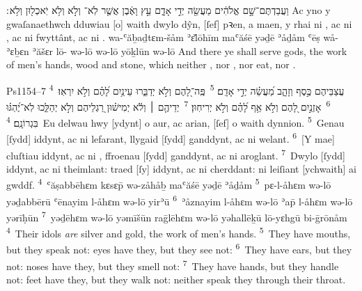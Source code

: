 \begin{example}{5}{4}{28}{}{}
	\quoling
	{וַעֲבַדְתֶּם־שָׁ֣ם אֱלֹהִ֔ים מַעֲשֵׂ֖ה יְדֵ֣י אָדָ֑ם עֵ֣ץ וָאֶ֔בֶן אֲשֶׁ֤ר לֹֽא־ וְלֹ֣א  וְלֹ֥א יֹֽאכְל֖וּן וְלֹ֥א ׃}
	{Ac yno y gwaſanaethwch dduwiau [o] waith dwylo dŷn, [ſef] pꝛen, a maen, y rhai ni , ac ni , ac ni fwyttânt, ac ni .}
	{wa-ʿăḇaḏtɛm-šåm ʾɛ̆lōhīm maʿăśē yəḏē ʾåḏåm ʿēṣ wå-ʾɛḇɛn ʾăšɛr lō- wə-lō  wə-lō yōḵlūn wə-lō }
	{And there ye shall serve gods, the work of men’s hands, wood and stone, which neither , nor , nor eat, nor .}
\end{example}

\begin{example}{Ps}{115}{4–7}{}{}
	\quoling	
	{\textsuperscript{4}~עֲצַבֵּיהֶם כֶּ֣סֶף וְזָהָ֑ב מַ֝עֲשֵׂ֗ה יְדֵ֣י אָדָֽם׃
		\textsuperscript{5}~פֶּֽה־לָ֭הֶם וְלֹ֣א יְדַבֵּ֑רוּ עֵינַ֥יִם לָ֝הֶ֗ם וְלֹ֣א יִרְאֽוּ׃
		\textsuperscript{6}~אָזְנַ֣יִם לָ֭הֶם וְלֹ֣א  אַ֥ף לָ֝הֶ֗ם וְלֹ֣א יְרִיחֽוּן׃
		\textsuperscript{7}~יְדֵיהֶ֤ם ׀ וְלֹ֬א יְמִישׁ֗וּן רַ֭גְלֵיהֶם וְלֹ֣א יְהַלֵּ֑כוּ לֹֽא־יֶ֝הְגּ֗וּ בִּגְרוֹנָֽם׃}
	{\textsuperscript{4}~Eu delwau hwy [ydynt] o aur, ac arian, [ſef] o waith dynnion.
		\textsuperscript{5}~Genau [ſydd] iddynt, ac ni lefarant, llygaid [ſydd] ganddynt, ac ni welant.
		\textsuperscript{6}~[Y mae] cluſtiau iddynt, ac ni , ffroenau [ſydd] ganddynt, ac ni aroglant.
		\textsuperscript{7}~Dwylo [ſydd] iddynt, ac ni theimlant: traed [ſy] iddynt, ac ni cherddant: ni leiſiant [ychwaith] ai gwddf.}
	{\textsuperscript{4}~ʿăṣabbēhɛm kɛsɛp̄ wə-zåhåḇ maʿăśē yəḏē ʾåḏåm
		\textsuperscript{5}~pɛ-l-åhɛm wə-lō yəḏabbērū ʿēnayim l-åhɛm wə-lō yirʾū
		\textsuperscript{6}~ʾåznayim l-åhɛm wə-lō  ʾap̄ l-åhɛm wə-lō yərīḥūn
		\textsuperscript{7}~yəḏēhɛm wə-lō yəmīšūn raḡlēhɛm wə-lō yəhallēḵū lō-yɛhgū bi-ḡrōnåm}
	{\textsuperscript{4}~Their idols \emph{are} silver and gold, the work of men's hands.
		\textsuperscript{5}~They have mouths, but they speak not: eyes have they, but they see not:
		\textsuperscript{6}~They have ears, but they  not: noses have they, but they smell not:
		\textsuperscript{7}~They have hands, but they handle not: feet have they, but they walk not: neither speak they through their throat.}
\end{example}


